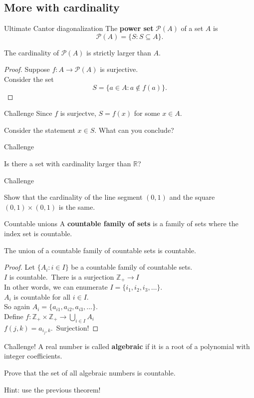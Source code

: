 \documentclass{beamer}
\begin{document}
\subsection{More with cardinality}

\begin{frame}{Ultimate Cantor diagonalization}
The \textbf{power set}  $\mathcal{P}(A)$ of a set $A$ is
$$\mathcal P(A) = \{S: S\subseteq A\}.$$
\pause
\begin{thm}
The cardinality of $\mathcal P(A)$ is strictly larger than $A$.
\end{thm}
\pause
\begin{proof}
\pause
Suppose $f: A\rightarrow \mathcal P(A)$ is surjective.\\
\pause
Consider the set
$$S = \{a\in A: a\notin f(a)\}.$$
\end{proof}
\end{frame}

\begin{frame}{Challenge}
\pause
Since $f$ is surjectve, $S = f(x)$ for some $x\in A$.
\pause
\begin{prob}
Consider the statement $x\in S$.  What can you conclude?
\end{prob}
\end{frame}

\begin{frame}{Challenge}
\begin{prob}
Is there a set with cardinality larger than $\mathbb{R}$?
\end{prob}
\end{frame}

\begin{frame}{Challenge}
\begin{prob}
Show that the cardinality of the line segment $(0,1)$ and the square $(0,1)\times (0,1)$ is the same.
\end{prob}
\end{frame}

\begin{frame}{Countable unions}
A \textbf{countable family of sets} is a family of sets where the index set is countable.
\pause
\begin{thm}
The union of a countable family of countable sets is countable.
\end{thm}
\pause
\begin{proof}
Let $\{A_i: i\in I\}$ be a countable family of countable sets.\\
\pause
$I$ is countable.\ \pause There is a surjection $\mathbb{Z}_+\rightarrow I$\\
\pause
In other words, we can enumerate $I = \{i_1,i_2,i_3,\dots\}$.\\
\pause
$A_i$ is countable for all $i\in I$.\\
\pause
So again $A_i = \{a_{i1},a_{i2},a_{i3},\dots\}$.\\
\pause
Define $f: \mathbb Z_+\times\mathbb Z_+\rightarrow \bigcup_{i\in I} A_i$\\
\pause
$f(j,k) = a_{i_j,k}$.\ \pause Surjection!
\end{proof}
\end{frame}

\begin{frame}{Challenge!}
A real number is called \textbf{algebraic} if it is a root of a polynomial with integer coefficients.
\pause
\begin{prob}
Prove that the set of all algebraic numbers is countable.
\end{prob}
\pause
Hint: use the previous theorem!
\end{frame}
\end{document}
